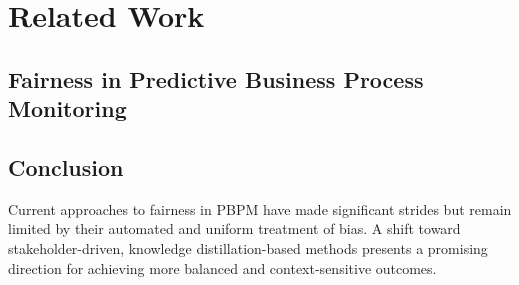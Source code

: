 \chapter{Related Work}

\section{Fairness in Predictive Business Process Monitoring}




\section{Conclusion}
Current approaches to fairness in PBPM have made significant strides
but remain limited by their automated and uniform treatment of bias.
A shift toward stakeholder-driven,
knowledge distillation-based methods presents a promising direction
for achieving more balanced and context-sensitive outcomes.